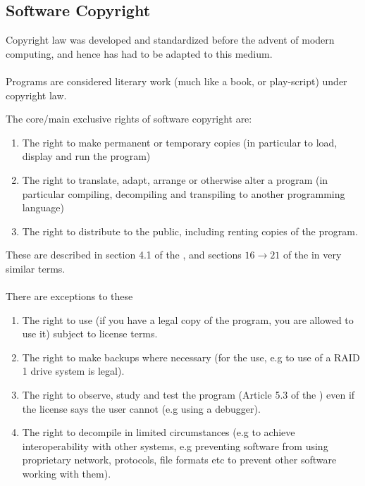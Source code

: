 \documentclass{report}
\begin{document}
\subsection*{Software Copyright}
Copyright law was developed and standardized before the advent of modern computing, and hence has had to be adapted to this medium.
\\
\\ Programs are considered literary work (much like a book, or play-script) under copyright law.


The core/main exclusive rights of software copyright are:
\begin{enumerate}
    \item The right to make permanent or temporary copies (in particular to load, display and run the program)
    \item The right to translate, adapt, arrange or otherwise alter a program (in particular compiling, decompiling and transpiling to another programming language)
    \item The right to distribute to the public, including renting copies of the program.
\end{enumerate}
These are described in section 4.1 of the , and sections $16 \to 21$ of the  in very similar terms.
\\
\\ There are exceptions to these
\begin{enumerate}
    \item The right to use (if you have a legal copy of the program, you are allowed to use it) subject to license terms.
    \item The right to make backups where necessary (for the use, e.g to use of a RAID 1 drive system is legal).
    \item The right to observe, study and test the program (Article 5.3 of the ) even if the license says the user cannot (e.g using a debugger).
    \item The right to decompile in limited circumstances (e.g to achieve interoperability with other systems, e.g preventing software from using proprietary network, protocols, file formats etc to prevent other software working with them).
\end{enumerate}
\end{document}
